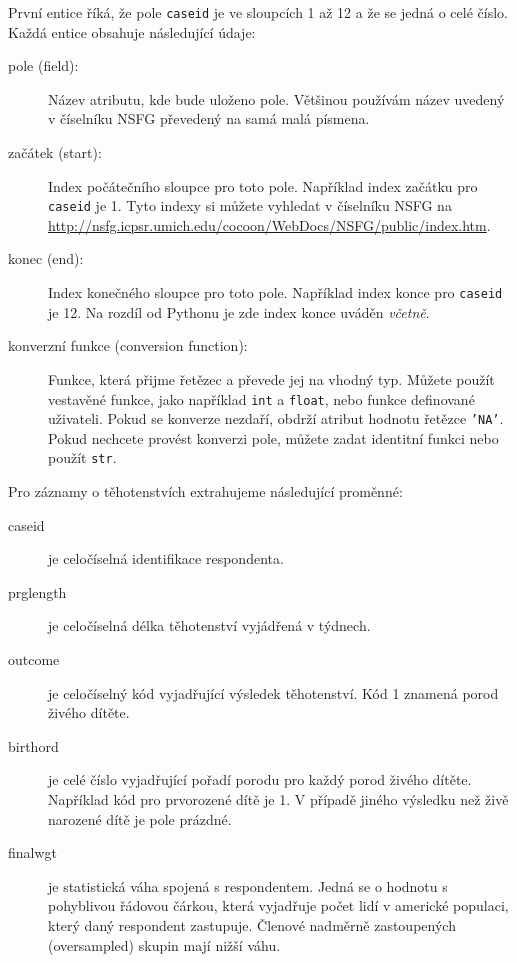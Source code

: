 \documentclass[12pt]{book}
\begin{document}
První entice říká, že pole {\tt caseid} je ve sloupcích 1 až 12 a že se jedná o celé číslo. Každá entice obsahuje následující údaje:

\begin{description}

\item[pole (field):] Název atributu, kde bude uloženo pole. Většinou používám název uvedený v číselníku NSFG převedený na samá malá písmena.

\item[začátek (start):] Index počátečního sloupce pro toto pole. Například index začátku pro {\tt caseid} je 1.
Tyto indexy si můžete vyhledat v číselníku NSFG na \url{http://nsfg.icpsr.umich.edu/cocoon/WebDocs/NSFG/public/index.htm}.

\item[konec (end):] Index konečného sloupce pro toto pole. Například index konce pro {\tt caseid} je 12.
Na rozdíl od Pythonu je zde index konce uváděn {\em včetně}.

\item[konverzní funkce (conversion function):] Funkce, která přijme řetězec a převede jej na vhodný typ. Můžete použít vestavěné funkce, jako například {\tt int} a {\tt float}, nebo funkce definované uživateli. Pokud se konverze nezdaří, obdrží atribut hodnotu řetězce {\tt 'NA'}.  Pokud nechcete provést konverzi pole, můžete zadat identitní funkci nebo použít {\tt str}.

\end{description}

Pro záznamy o těhotenstvích extrahujeme následující proměnné:

\begin{description}

\item[caseid] je celočíselná identifikace respondenta.

\item[prglength] je celočíselná délka těhotenství vyjádřená v týdnech.

\item[outcome] je celočíselný kód vyjadřující výsledek těhotenství. Kód 1 znamená porod živého dítěte.

\item[birthord] je celé číslo vyjadřující pořadí porodu pro každý porod živého dítěte. Například kód pro prvorozené dítě je 1.
V případě jiného výsledku než živě narozené dítě je pole prázdné.

\item[finalwgt] je statistická váha spojená s respondentem. Jedná se o hodnotu s pohyblivou řádovou čárkou, která vyjadřuje počet lidí v americké populaci, který daný respondent zastupuje. Členové nadměrně zastoupených (oversampled) skupin mají nižší váhu.

\end{description}
\end{document}
